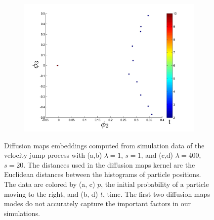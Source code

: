 \documentclass[prl, reprint, final]{revtex4-1}
\begin{document}
\begin{figure}[htb]
\begin{subfigure}{0.2\textwidth}
\caption{}
\end{subfigure}
\begin{subfigure}{0.2\textwidth}
\includegraphics[width=\textwidth]{rawhist_t_400}
\caption{}
\end{subfigure}
\caption{Diffusion maps embeddings computed from simulation data of the velocity jump process with (a,b) $\lambda=1$, $s=1$, and (c,d) $\lambda=400$, $s=20$. The distances used in the diffusion maps kernel are the Euclidean distances between the histograms of particle positions. The data are colored by (a, c) $p$, the initial probability of a particle moving to the right, and (b, d) $t$, time. The first two diffusion maps modes do not accurately capture the important factors in our simulations.}
\label{fig:dmaps_embed_noemd}
\end{figure}
\end{document}
